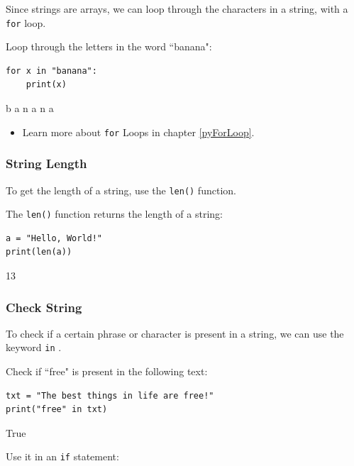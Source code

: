 \documentclass[12pt,a4paper]{article}
\newcommand{\code}[1]{%
	\colorbox{backcolour}{\lstinline{#1}}%
}
\begin{document}
Since strings are arrays, we can loop through the characters in a string, with
a \code{for} loop.

\begin{ebox}
Loop through the letters in the word ``banana":

	\begin{lstlisting}
for x in "banana":
    print(x)
	\end{lstlisting}
\tcblower
	\begin{vercode}
b
a
n
a
n
a
	\end{vercode}
\end{ebox}

\begin{itemize}
	\item Learn more about \code{for} Loops in chapter \ref{pyForLoop}.
\end{itemize}
\subsubsection{String Length}

To get the length of a string, use the \code{len()} function.

\begin{ebox}
The \code{len()} function returns the length of a string:
	\begin{lstlisting}
a = "Hello, World!"
print(len(a))
	\end{lstlisting}
\tcblower
	\begin{vercode}
13
	\end{vercode}
\end{ebox}
\subsubsection{Check String}

To check if a certain phrase or character is present in a string,
we can use the keyword \code{in}.

\begin{ebox}
Check if ``free" is present in the following text:
	\begin{lstlisting}
txt = "The best things in life are free!"
print("free" in txt)
	\end{lstlisting}
\tcblower
	\begin{vercode}
True
	\end{vercode}
\end{ebox}

Use it in an \code{if} statement:
\end{document}
